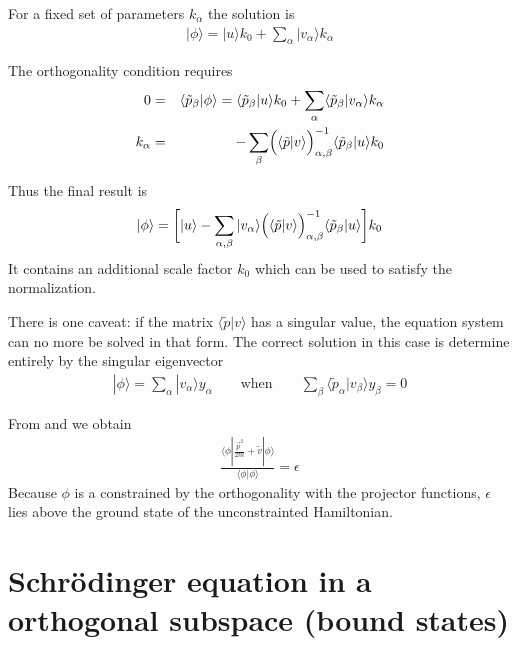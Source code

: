 \documentclass[11pt,a4paper]{report}
\begin{document}
For a fixed set of parameters $k_\alpha$ the solution is
\begin{eqnarray}
|\phi\rangle=|u\rangle k_0+\sum_\alpha |v_\alpha\rangle k_\alpha
\end{eqnarray}

The orthogonality condition requires
\begin{eqnarray}
0&=&\langle\tilde{p}_\beta|\phi\rangle
=\langle\tilde{p}_\beta|u\rangle k_0
+\sum_\alpha \langle\tilde{p}_\beta|v_\alpha\rangle k_\alpha
\\
k_\alpha&=&-\sum_\beta 
\Bigl(\langle\tilde{p}|v\rangle\Bigr)^{-1}_{\alpha,\beta}
\langle\tilde{p}_\beta|u\rangle k_0
\end{eqnarray}

Thus the final result is
\begin{eqnarray}
|\phi\rangle=\biggl[|u\rangle-\sum_{\alpha,\beta} |v_\alpha\rangle
\Bigl(\langle\tilde{p}|v\rangle\Bigr)^{-1}_{\alpha,\beta}
\langle\tilde{p}_\beta|u\rangle\biggr] k_0
\end{eqnarray}
It contains an additional scale factor $k_0$ which can be used to
satisfy the normalization.

There is one caveat: if the matrix $\langle\tilde{p}|v\rangle$ has a
singular value, the equation system can no more be solved in that
form.  The correct solution in this case is determine entirely by the
singular eigenvector
\begin{eqnarray}
|\phi\rangle=\sum_{\alpha} |v_\alpha\rangle y_\alpha
\qquad\text{when}\qquad
\sum_\beta \langle\tilde{p}_\alpha|v_\beta\rangle y_\beta=0
\end{eqnarray}


From  and  we obtain
\begin{eqnarray}
\frac{\langle\phi|\frac{\vec{p}^2}{2m}+\tilde{v}|\phi\rangle}
{\langle\phi|\phi\rangle}
=\epsilon
\end{eqnarray}
Because $\phi$ is a constrained by the orthogonality with the
projector functions, $\epsilon$ lies above the ground state of the
unconstrainted Hamiltonian.

\section{Schr\"odinger equation in a orthogonal subspace (bound states)}
\label{app:schrorthobound}
\end{document}
